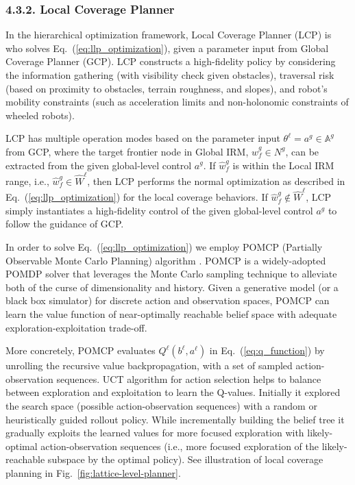 \documentclass[letterpaper]{article} %
\newcommand{\phdone}[1]{} %
\begin{document}
\subsubsection{4.3.2. Local Coverage Planner} \label{sssec:LCP}
\phdone{LCP Functionality}
In the hierarchical optimization framework, Local Coverage Planner (LCP) is who solves Eq.~(\ref{eq:llp_optimization}), given a parameter input from Global Coverage Planner (GCP).
LCP constructs a high-fidelity policy by considering the information gathering (with visibility check given obstacles), traversal risk (based on proximity to obstacles, terrain roughness, and slopes), and robot's mobility constraints (such as acceleration limits and non-holonomic constraints of wheeled robots).


\phdone{LCP Problem Characteristics}
LCP has multiple operation modes based on the parameter input $\theta^\ell = a^g \in \mathbb{A}^g$ from GCP,
where the target frontier node in Global IRM, $\hat{w}^g_f \in N^g$, can be extracted from the given global-level control $a^g$.
%
If $\hat{w}^g_f$ is within the Local IRM range, i.e., $\hat{w}^g_f \in \hat{W}^\ell$, then LCP performs the normal optimization as described in Eq.~(\ref{eq:llp_optimization}) for the local coverage behaviors.
If $\hat{w}^g_f \notin \hat{W}^\ell$, LCP simply instantiates a high-fidelity control of the given global-level control $a^g$ to follow the guidance of GCP.



\phdone{POMDP Solver LCP}
In order to solve Eq.~(\ref{eq:llp_optimization}) we employ POMCP (Partially Observable Monte Carlo Planning) algorithm \cite{silver2010monte}.
POMCP is a widely-adopted POMDP solver that leverages the Monte Carlo sampling technique to alleviate both of the curse of dimensionality and history.
Given a generative model (or a black box simulator) for discrete action and observation spaces, POMCP can learn the value function of near-optimally reachable belief space with adequate exploration-exploitation trade-off.


\phdone{POMCP Details}
More concretely, POMCP evaluates $Q^\ell(b^\ell, a^\ell)$ in Eq.~(\ref{eq:q_function}) by unrolling the recursive value backpropagation, with a set of sampled action-observation sequences.
UCT algorithm for action selection helps to balance between exploration and exploitation to learn the Q-values.
Initially it explored the search space (possible action-observation sequences) with a random or heuristically guided rollout policy.
While incrementally building the belief tree it gradually exploits the learned values for more focused exploration with likely-optimal action-observation sequences (i.e., more focused exploration of the likely-reachable subspace by the optimal policy).
See illustration of local coverage planning in Fig.~\ref{fig:lattice-level-planner}.
\end{document}

